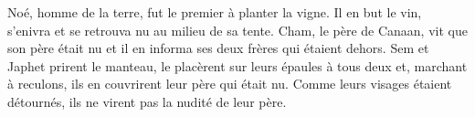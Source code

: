 Noé, homme de la terre, fut le premier à planter la vigne.
Il en but le vin, s’enivra et se retrouva nu au milieu de sa tente.
Cham, le père de Canaan, vit que son père était nu
	et il en informa ses deux frères qui étaient dehors.
Sem et Japhet prirent le manteau,
	le placèrent sur leurs épaules à tous deux
	et, marchant à reculons, ils en couvrirent leur père qui était nu.
Comme leurs visages étaient détournés,
	ils ne virent pas la nudité de leur père.
